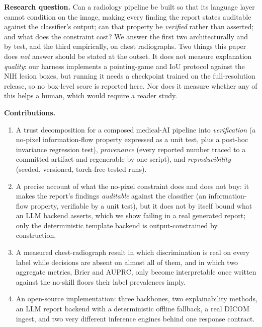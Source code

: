 \documentclass[conference]{IEEEtran}
\newcommand{\rih}[1]{\textbf{#1}\enspace\ignorespaces}
\begin{document}
\rih{Research question.} Can a radiology pipeline be built so that its language
layer cannot condition on the image, making every finding the report states
auditable against the classifier's output; can that property be \emph{verified}
rather than asserted; and what does the constraint cost? We answer the first two architecturally and by test, and the
third empirically, on chest radiographs. Two things this paper does \emph{not}
answer should be stated at the outset. It does not measure explanation
\emph{quality}: our harness implements a pointing-game and IoU protocol against the
NIH lesion boxes, but running it needs a checkpoint trained on the full-resolution
release, so no box-level score is reported here. Nor does it measure whether any of
this helps a human, which would require a reader study.

\rih{Contributions.}
\begin{enumerate}[leftmargin=1.3em,itemsep=1pt,topsep=2pt]
  \item A trust decomposition for a composed medical-AI pipeline into
  \emph{verification} (a no-pixel information-flow property expressed as a unit test,
  plus a post-hoc invariance regression test), \emph{provenance} (every reported
  number traced to a committed artifact and regenerable by one script), and
  \emph{reproducibility} (seeded, versioned, torch-free-tested runs).
  \item A precise account of what the no-pixel constraint does and does not buy: it
  makes the report's findings \emph{auditable} against the classifier (an
  information-flow property, verifiable by a unit test), but it does not by itself
  bound what an LLM backend asserts, which we show failing in a real generated
  report; only the deterministic template backend is output-constrained by
  construction.
  \item A measured chest-radiograph result in which discrimination is real on every
  label while decisions are absent on almost all of them, and in which two
  aggregate metrics, Brier and AUPRC, only become interpretable once written
  against the no-skill floors their label prevalences imply.
  \item An open-source implementation: three backbones, two explainability methods,
  an LLM report backend with a deterministic offline fallback, a real DICOM ingest,
  and two very different inference engines behind one response contract.
\end{enumerate}

\end{document}
